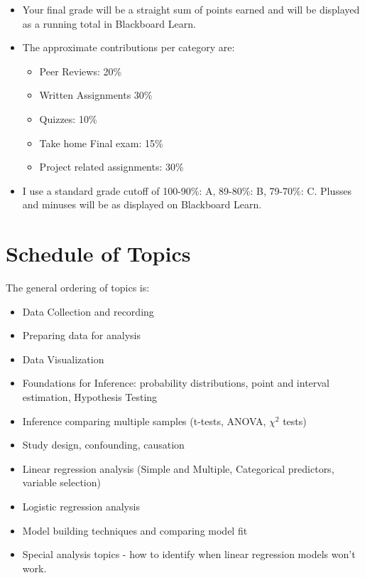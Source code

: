 \documentclass[
  letterpaper,
  DIV=11,
  numbers=noendperiod]{scrartcl}
\providecommand{\tightlist}{%
  \setlength{\itemsep}{0pt}\setlength{\parskip}{0pt}}\usepackage{longtable,booktabs,array}
\begin{document}
\begin{itemize}
\tightlist
\item
  Your final grade will be a straight sum of points earned and will be
  displayed as a running total in Blackboard Learn.
\item
  The approximate contributions per category are:

  \begin{itemize}
  \tightlist
  \item
    Peer Reviews: 20\%
  \item
    Written Assignments 30\%
  \item
    Quizzes: 10\%
  \item
    Take home Final exam: 15\%
  \item
    Project related assignments: 30\%\\
  \end{itemize}
\item
  I use a standard grade cutoff of 100-90\%: A, 89-80\%: B, 79-70\%: C.
  Plusses and minuses will be as displayed on Blackboard Learn.
\end{itemize}

\hypertarget{schedule-of-topics}{%
\section{Schedule of Topics}\label{schedule-of-topics}}

The general ordering of topics is:

\begin{itemize}
\tightlist
\item
  Data Collection and recording
\item
  Preparing data for analysis
\item
  Data Visualization
\item
  Foundations for Inference: probability distributions, point and
  interval estimation, Hypothesis Testing
\item
  Inference comparing multiple samples (t-tests, ANOVA, \(\chi^{2}\)
  tests)
\item
  Study design, confounding, causation
\item
  Linear regression analysis (Simple and Multiple, Categorical
  predictors, variable selection)
\item
  Logistic regression analysis
\item
  Model building techniques and comparing model fit
\item
  Special analysis topics - how to identify when linear regression
  models won't work.
\end{itemize}
\end{document}
